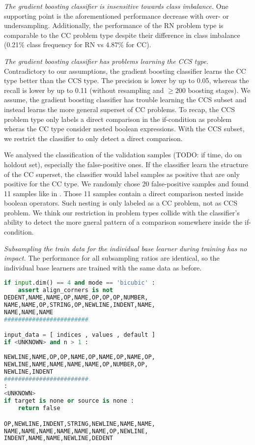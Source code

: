 \textit{The gradient boosting classifier is insensitive towards class imbalance.} One supporting point is the aforementioned performance decrease with over- or undersampling. Additionally, the performance of the RN problem type is comparable to the CC problem type despite their difference in class imbalance (0.21\% class frequency for RN vs 4.87\% for CC). 

\textit{The gradient boosting classifier has problems learning the CCS type.} Contradictory to our assumptions, the gradient boosting classifier learns the CC type better than the CCS type. The precision is lower by up to 0.05, whereas the recall is lower by up to 0.11 (without resampling and $\geq 200$ boosting stages). We assume, the gradient boosting classifier has trouble learning the CCS subset and instead learns the more general superset of CC problems. To recap, the CCS problem type only labels a direct comparison in the if-condition as problem wheras the CC type consider nested boolean expressions. With the CCS subset, we restrict the classifier to only detect a direct comparison. 

We analysed the classification of the validation samples (TODO: if time, do on holdout set), especially the false-positive ones. If the classifier learn the structure of the CC superset, the classifier would label samples as positive that are only positive for the CC type. We randomly chose 20 false-positive samples and found 11 samples like in . Those 11 samples contain a direct comparison nested inside boolean operators. Such nesting is only labeled as a CC problem, not as CCS problem. We think our restriction in problem types collide with the classifier's ability to detect the more gneral pattern of a comparison somewhere inside the if-condition.


\textit{Subsampling the train data for the individual base learner during training has no impact.} The performance for all subsampling ratios are identical, so the individual base learners are trained with the same data as before.


\begin{lstlisting}[float=h, language=Python, label=lst:gbc_false_positive, caption={False-positive samples for the best performing random forest classifier with 300 boosting stages, a learning rate of 0.2, type encoding and without resampling for the CCS type. We removed spaces between tokens if necessary, but leave the intendation as in the sample.}]
    if input.dim() == 4 and mode == 'bicubic' : 
    assert align_corners is not
DEDENT,NAME,NAME,OP,NAME,OP,OP,OP,NUMBER,
NAME,NAME,OP,STRING,OP,NEWLINE,INDENT,NAME,
NAME,NAME,NAME
########################

input_data = [ indices , values , default ] 
if <UNKNOWN> and n > 1 : 
       
NEWLINE,NAME,OP,OP,NAME,OP,NAME,OP,NAME,OP,
NEWLINE,NAME,NAME,NAME,NAME,OP,NUMBER,OP,
NEWLINE,INDENT
########################
: 
<UNKNOWN> 
if target is none or source is none : 
    return false 

OP,NEWLINE,INDENT,STRING,NEWLINE,NAME,NAME,
NAME,NAME,NAME,NAME,NAME,NAME,OP,NEWLINE,
INDENT,NAME,NAME,NEWLINE,DEDENT
\end{lstlisting}

